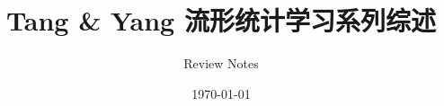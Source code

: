 \documentclass[12pt]{amsbook}
\theoremstyle{plain}
\begin{document}
\title{Tang \& Yang 流形统计学习系列综述}
\author{Review Notes}
\date{\today}
\maketitle

\tableofcontents






\end{document}
